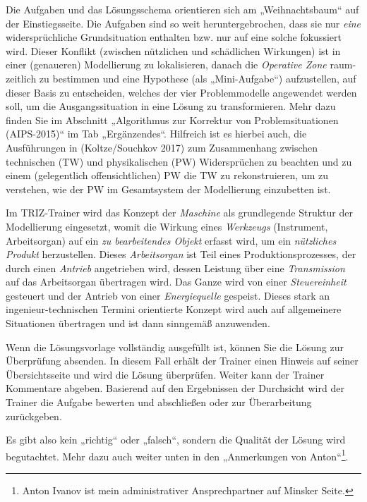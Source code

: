 \documentclass[11pt,a4paper]{article}
\begin{document}
Die Aufgaben und das Lösungsschema orientieren sich am „Weihnachtsbaum“ auf
der Einstiegsseite.  Die Aufgaben sind so weit heruntergebrochen, dass sie nur
\emph{eine} widersprüchliche Grundsituation enthalten bzw. nur auf eine solche
fokussiert wird.  Dieser Konflikt (zwischen nützlichen und schädlichen
Wirkungen) ist in einer (genaueren) Modellierung zu lokalisieren, danach die
\emph{Operative Zone} raum-zeitlich zu bestimmen und eine Hypothese (als
„Mini-Aufgabe“) aufzustellen, auf dieser Basis zu entscheiden, welches der
vier Problemmodelle angewendet werden soll, um die Ausgangssituation in eine
Lösung zu transformieren.  Mehr dazu finden Sie im Abschnitt „Algorithmus zur
Korrektur von Problemsituationen (AIPS-2015)“ im Tab „Ergänzendes“.  Hilfreich
ist es hierbei auch, die Ausführungen in (Koltze/Souchkov 2017) zum
Zusammenhang zwischen technischen (TW) und physikalischen (PW) Widersprüchen
zu beachten und zu einem (gelegentlich offensichtlichen) PW die TW zu
rekonstruieren, um zu verstehen, wie der PW im Gesamtsystem der Modellierung
einzubetten ist.
\enlargethispage{-1em}

Im TRIZ-Trainer wird das Konzept der \emph{Maschine} als grundlegende Struktur
der Modellierung eingesetzt, womit die Wirkung eines \emph{Werkzeugs}
(Instrument, Arbeitsorgan) auf ein \emph{zu bearbeitendes Objekt} erfasst
wird, um ein \emph{nützliches Produkt} herzustellen.  Dieses
\emph{Arbeitsorgan} ist Teil eines Produktionsprozesses, der durch einen
\emph{Antrieb} angetrieben wird, dessen Leistung über eine \emph{Transmission}
auf das Arbeitsorgan übertragen wird.  Das Ganze wird von einer
\emph{Steuereinheit} gesteuert und der Antrieb von einer \emph{Energiequelle}
gespeist.  Dieses stark an ingenieur-technischen Termini orientierte Konzept
wird auch auf allgemeinere Situationen übertragen und ist dann sinngemäß
anzuwenden.

Wenn die Lösungsvorlage vollständig ausgefüllt ist, können Sie die Lösung zur
Überprüfung absenden. In diesem Fall erhält der Trainer einen Hinweis auf
seiner Übersichtsseite und wird die Lösung überprüfen.  Weiter kann der
Trainer Kommentare abgeben. Basierend auf den Ergebnissen der Durchsicht wird
der Trainer die Aufgabe bewerten und abschließen oder zur Überarbeitung
zurückgeben.

Es gibt also kein „richtig“ oder „falsch“, sondern die Qualität der Lösung
wird begutachtet. Mehr dazu auch weiter unten in den „Anmerkungen von
Anton“\footnote{Anton Ivanov ist mein administrativer Ansprechpartner auf
  Minsker Seite.}.
\end{document}

